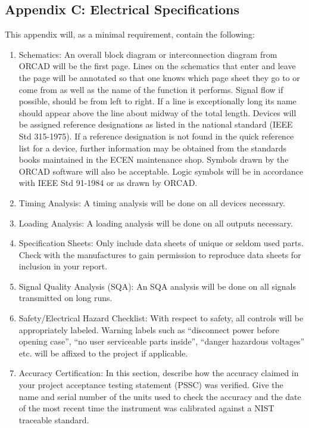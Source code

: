 \documentclass[12pt]{article}
\begin{document}
\subsection*{Appendix C: Electrical Specifications}
This appendix will, as a minimal requirement, contain the following:
\begin{enumerate}[noitemsep]
    \item Schematics: An overall block diagram or interconnection diagram from ORCAD will be the first page. Lines on the schematics that enter and leave the page will be annotated so that one knows which page sheet they go to or come from as well as the name of the function it performs. Signal flow if possible, should be from left to right. If a line is exceptionally long its name should appear above the line about midway of the total length. Devices will be assigned reference designations as listed in the national standard (IEEE Std 315-1975). If a reference designation is not found in the quick reference list for a device, further information may be obtained from the standards books maintained in the ECEN maintenance shop. Symbols drawn by the ORCAD software will also be acceptable. Logic symbols will be in accordance with IEEE Std 91-1984 or as drawn by ORCAD.
    \item Timing Analysis: A timing analysis will be done on all devices necessary.
    \item Loading Analysis: A loading analysis will be done on all outputs necessary.
    \item Specification Sheets: Only include data sheets of unique or seldom used parts. Check with the manufactures to gain permission to reproduce data sheets for inclusion in your report.
    \item Signal Quality Analysis (SQA): An SQA analysis will be done on all signals transmitted on long runs.
    \item Safety/Electrical Hazard Checklist: With respect to safety, all controls will be appropriately labeled. Warning labels such as “disconnect power before opening case”, “no user serviceable parts inside”, “danger hazardous voltages” etc. will be affixed to the project if applicable.
    \item Accuracy Certification: In this section, describe how the accuracy claimed in your project acceptance testing statement (PSSC) was verified. Give the name and serial number of the units used to check the accuracy and the date of the most recent time the instrument was calibrated against a NIST traceable standard.
\end{enumerate}
\end{document}
